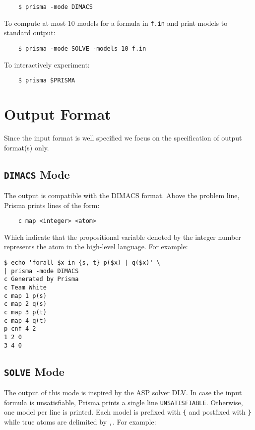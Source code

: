 \documentclass{llncs}
\begin{document}
\begin{enumerate}
	\begin{verbatim}
	$ prisma -mode DIMACS
	\end{verbatim}
	
To compute at most 10 models for a formula in \texttt{f.in} and print models to standard output:

	\begin{verbatim}
	$ prisma -mode SOLVE -models 10 f.in
	\end{verbatim}

To interactively experiment:

	\begin{verbatim}
	$ prisma $PRISMA
	\end{verbatim}
	
\section{Output Format}
\label{sec:output}

Since the input format is well specified we focus on the specification of output format(s) only.

\subsection{\texttt{DIMACS} Mode}

The output is compatible with the DIMACS format. Above the problem line, Prisma prints lines of the form:

	\begin{verbatim}
	c map <integer> <atom>
	\end{verbatim}

Which indicate that the propositional variable denoted by the integer number represents the atom in the high-level language. For example:

\begin{verbatim}
$ echo 'forall $x in {s, t} p($x) | q($x)' \
| prisma -mode DIMACS
c Generated by Prisma
c Team White
c map 1 p(s)
c map 2 q(s)
c map 3 p(t)
c map 4 q(t)
p cnf 4 2
1 2 0
3 4 0

\end{verbatim}

\subsection{\texttt{SOLVE} Mode}

The output of this mode is inspired by the ASP solver DLV. In case the input formula is unsatisfiable, Prisma prints a single line \texttt{UNSATISFIABLE}. Otherwise, one model per line is printed. Each model is prefixed with \texttt{\{} and postfixed with \texttt{\}} while true atoms are delimited by \texttt{,}. For example:


\end{enumerate}
\end{document}
